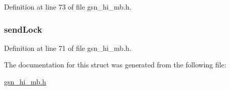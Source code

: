 Definition at line 73 of file gsn\_\-hi\_\-mb.h.

\hypertarget{a00089_ab0b7abdc981e00b9cfe9138cde2cbaf3}{
\subsubsection[{sendLock}]{ {\bf sendLock}}}
\label{a00089_ab0b7abdc981e00b9cfe9138cde2cbaf3}


Definition at line 71 of file gsn\_\-hi\_\-mb.h.



The documentation for this struct was generated from the following file:\begin{DoxyCompactItemize}
\item 
\hyperlink{a00506}{gsn\_\-hi\_\-mb.h}\end{DoxyCompactItemize}
